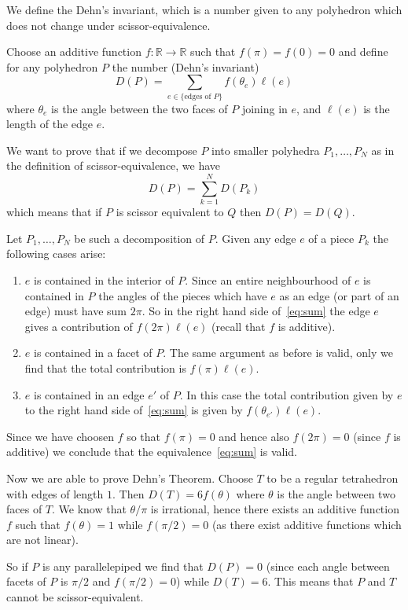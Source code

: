 \documentclass[12pt]{article}
\newcommand{\R}{\mathbb R}
\theoremstyle{remark}
\begin{document}
We define the Dehn's invariant, which is a number given to any polyhedron which does not change under scissor-equivalence.

Choose an additive function $f\colon \R\to \R$ 
such that $f(\pi)=f(0)=0$
and define for any polyhedron $P$ 
the number (Dehn's invariant)
\[
  D(P) = \sum_{e \in \{\text{edges of $P$}\}} f(\theta_e) \ell(e)
\]
where $\theta_e$ is the angle between the two faces of $P$ joining in $e$, and $\ell(e)$ is the length of the edge $e$.

We want to prove that if we decompose $P$ into smaller polyhedra $P_1,\ldots,P_N$ as in the definition of scissor-equivalence, we have 
\begin{equation}\label{eq:sum}
  D(P) = \sum_{k=1}^N D(P_k)
\end{equation}
which means that if $P$ is scissor equivalent to $Q$ then $D(P)=D(Q)$.

Let $P_1,\ldots,P_N$ be such a decomposition of $P$. Given any edge $e$ of a piece $P_k$ the following cases arise:
\begin{enumerate}
\item $e$ is contained in the interior of $P$. Since an entire neighbourhood of $e$ is contained in $P$ the angles of the pieces which have $e$ as an edge (or part of an edge) must have sum $2\pi$. So in the right hand side of~\eqref{eq:sum} the edge $e$ gives a contribution of $f(2\pi)\ell(e)$ (recall
that $f$ is additive).

\item
$e$ is contained in a facet of $P$. The same argument as before is valid, only we find that the total contribution is $f(\pi)\ell(e)$.

\item
$e$ is contained in an edge $e'$ of $P$. In this case the total contribution given by $e$ to the right hand side of~\eqref{eq:sum} is given by $f(\theta_{e'})\ell(e)$.
\end{enumerate}

Since we have choosen $f$ so that $f(\pi)=0$ and hence also $f(2\pi)=0$ (since $f$ is additive) we conclude that the equivalence~\eqref{eq:sum} is valid.

Now we are able to prove Dehn's Theorem. Choose $T$ to be a regular tetrahedron with edges of length $1$. Then $D(T)=6 f(\theta)$ where $\theta$ is the angle between two faces of $T$. We know that $\theta/\pi$ is irrational, hence there exists an additive function $f$ such that $f(\theta)=1$ while $f(\pi/2)=0$ (as there exist additive functions which are not linear).

So if $P$ is any parallelepiped we find that $D(P)=0$ (since each angle between facets of $P$ is $\pi/2$ and $f(\pi/2)=0$) while $D(T)=6$. This means that $P$ and $T$ cannot be scissor-equivalent.
\end{document}
